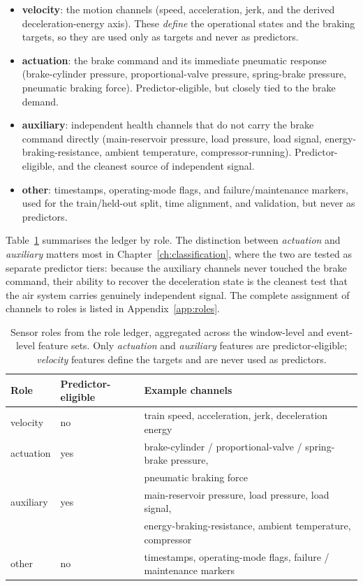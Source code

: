 \begin{itemize}
  \item \textbf{velocity}: the motion channels (speed, acceleration, jerk, and the derived
        deceleration-energy axis). These \emph{define} the operational states and the
        braking targets, so they are used only as targets and never as predictors.
  \item \textbf{actuation}: the brake command and its immediate pneumatic response
        (brake-cylinder pressure, proportional-valve pressure, spring-brake pressure,
        pneumatic braking force). Predictor-eligible, but closely tied to the brake demand.
  \item \textbf{auxiliary}: independent health channels that do not carry the brake command
        directly (main-reservoir pressure, load pressure, load signal,
        energy-braking-resistance, ambient temperature, compressor-running).
        Predictor-eligible, and the cleanest source of independent signal.
  \item \textbf{other}: timestamps, operating-mode flags, and failure/maintenance markers,
        used for the train/held-out split, time alignment, and validation, but never as
        predictors.
\end{itemize}

Table~\ref{tab:roles} summarises the ledger by role. The distinction between
\emph{actuation} and \emph{auxiliary} matters most in Chapter~\ref{ch:classification},
where the two are tested as separate predictor tiers: because the auxiliary channels never
touched the brake command, their ability to recover the deceleration state is the cleanest
test that the air system carries genuinely independent signal. The complete assignment of
channels to roles is listed in Appendix~\ref{app:roles}.

\begin{table}[htbp]
  \centering
  \caption{Sensor roles from the role ledger, aggregated across the window-level and
  event-level feature sets. Only \emph{actuation} and \emph{auxiliary} features are
  predictor-eligible; \emph{velocity} features define the targets and are never used as
  predictors.}
  \label{tab:roles}
  \begin{tabular}{lll}
    \toprule
    Role       & Predictor-eligible & Example channels \\
    \midrule
    velocity   & no  & train speed, acceleration, jerk, deceleration energy \\
    actuation  & yes & brake-cylinder / proportional-valve / spring-brake pressure, \\
               &     & pneumatic braking force \\
    auxiliary  & yes & main-reservoir pressure, load pressure, load signal, \\
               &     & energy-braking-resistance, ambient temperature, compressor \\
    other      & no  & timestamps, operating-mode flags, failure / maintenance markers \\
    \bottomrule
  \end{tabular}
\end{table}

